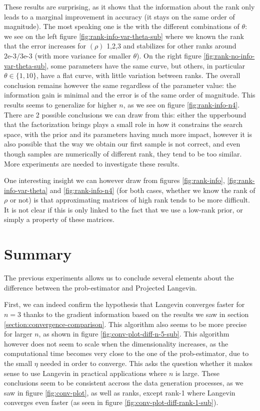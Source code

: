 \documentclass[12pt]{memoir}
\newcommand{\rhorank}[0]{\text{rank}$(\rho) $ }
\begin{document}
These results are surprising, as it shows that the information about the rank only leads to a marginal improvement in accuracy (it stays on the same order of magnitude). The most speaking one is the with the different combinations of $\theta$: we see on the left figure \ref{fig:rank-info-var-theta-sub} where we known the rank that the error increases for \rhorank{1,2,3} and stabilizes for other ranks around $2\text{e-}3/3\text{e-}3$ (with more variance for smaller $\theta$). On the right figure \ref{fig:rank-no-info-var-theta-sub}, some parameters have the same curve, but others, in particular $\theta \in\{1,10\}$, have a flat curve, with little variation between ranks. The overall conclusion remains however the same regardless of the parameter value: the information gain is minimal and the error is of the same order of magnitude. This results seems to generalize for higher $n$, as we see on figure \ref{fig:rank-info-n4}. There are 2 possible conclusions we can draw from this: either the upperbound that the factorization brings plays a small role in how it constrains the search space, with the prior and its parameters having much more impact, however it is also possible that the way we obtain our first sample is not correct, and even though samples are numerically of different rank, they tend to be too similar. More experiments are needed to investigate these results.\medbreak

One interesting insight we can however draw from figures \ref{fig:rank-info}, \ref{fig:rank-info-var-theta} and \ref{fig:rank-info-n4} (for both cases, whether we know the rank of $\rho$ or not) is that approximating matrices of high rank tends to be more difficult. It is not clear if this is only linked to the fact that we use a low-rank prior, or simply a property of these matrices.

\section{Summary}
The previous experiments allows us to conclude several elements about the difference between the prob-estimator and Projected Langevin. \medbreak

First, we can indeed confirm the hypothesis that Langevin converges faster for $n=3$ thanks to the gradient information based on the results we saw in section \ref{section:convergence-comparison}. This algorithm also seems to be more precise for larger $n$, as shown in figure \ref{fig:conv-plot-diff-n-5-sub}. This algorithm however does not seem to scale when the dimensionality increases, as the computational time becomes very close to the one of the prob-estimator, due to the small $\eta$ needed in order to converge. This asks the question whether it makes sense to use Langevin in practical applications where $n$ is large. These conclusions seem to be consistent accross the data generation processes, as we saw in figure \ref{fig:conv-plot}, as well as ranks, except rank-1 where Langevin converges even faster (as seen in figure \ref{fig:conv-plot-diff-rank-1-sub}).\medbreak
\end{document}
